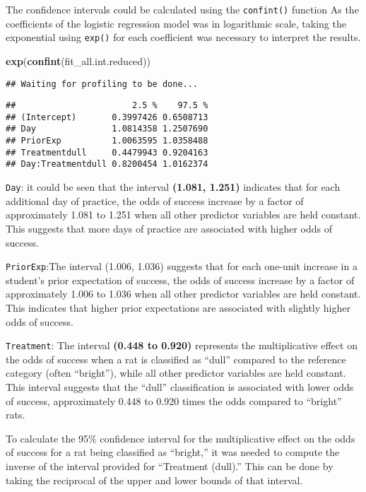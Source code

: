 \documentclass[
]{article}
\newenvironment{Shaded}{\begin{snugshade}}{\end{snugshade}}
\newcommand{\FunctionTok}[1]{\textcolor[rgb]{0.13,0.29,0.53}{\textbf{#1}}}
\newcommand{\NormalTok}[1]{#1}
\begin{document}
The confidence intervals could be calculated using the
\texttt{confint()} function As the coefficients of the logistic
regression model was in logarithmic scale, taking the exponential using
\texttt{exp()} for each coefficient was necessary to interpret the
results.

\begin{Shaded}
\begin{Highlighting}[]
\FunctionTok{exp}\NormalTok{(}\FunctionTok{confint}\NormalTok{(fit\_all.int.reduced))}
\end{Highlighting}
\end{Shaded}

\begin{verbatim}
## Waiting for profiling to be done...
\end{verbatim}

\begin{verbatim}
##                       2.5 %    97.5 %
## (Intercept)       0.3997426 0.6508713
## Day               1.0814358 1.2507690
## PriorExp          1.0063595 1.0358488
## Treatmentdull     0.4479943 0.9204163
## Day:Treatmentdull 0.8200454 1.0162374
\end{verbatim}

\texttt{Day}: it could be seen that the interval \textbf{(1.081, 1.251)}
indicates that for each additional day of practice, the odds of success
increase by a factor of approximately 1.081 to 1.251 when all other
predictor variables are held constant. This suggests that more days of
practice are associated with higher odds of success.

\texttt{PriorExp}:The interval (1.006, 1.036) suggests that for each
one-unit increase in a student's prior expectation of success, the odds
of success increase by a factor of approximately 1.006 to 1.036 when all
other predictor variables are held constant. This indicates that higher
prior expectations are associated with slightly higher odds of success.

\texttt{Treatment}: The interval \textbf{(0.448 to 0.920)} represents
the multiplicative effect on the odds of success when a rat is
classified as ``dull'' compared to the reference category (often
``bright''), while all other predictor variables are held constant. This
interval suggests that the ``dull'' classification is associated with
lower odds of success, approximately 0.448 to 0.920 times the odds
compared to ``bright'' rats.

To calculate the 95\% confidence interval for the multiplicative effect
on the odds of success for a rat being classified as ``bright,'' it was
needed to compute the inverse of the interval provided for ``Treatment
(dull).'' This can be done by taking the reciprocal of the upper and
lower bounds of that interval.
\end{document}
